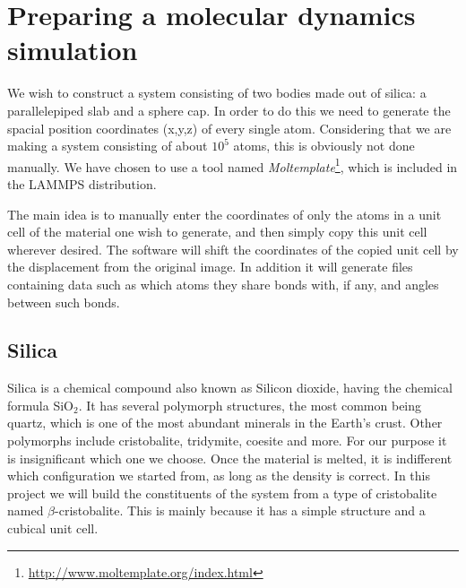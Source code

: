 \documentclass[twoside,english]{uiofysmaster}
\begin{document}
\chapter{Preparing a molecular dynamics simulation}

We wish to construct a system consisting of two bodies made out of silica: a parallelepiped slab and a sphere cap. In order to do this we need to generate the spacial position coordinates (x,y,z) of every single atom. Considering that we are making a system consisting of about $10^5$ atoms, this is obviously not done manually. We have chosen to use a tool named \textit{Moltemplate}\footnote{\href{http://www.moltemplate.org/index.html}{http://www.moltemplate.org/index.html}}, which is included in the LAMMPS distribution.

The main idea is to manually enter the coordinates of only the atoms in a unit cell of the material one wish to generate, and then simply copy this unit cell wherever desired. The software will shift the coordinates of the copied unit cell by the displacement from the original image. In addition it will generate files containing data such as which atoms they share bonds with, if any, and angles between such bonds. 

\section{Silica}
Silica is a chemical compound also known as Silicon dioxide, having the chemical formula SiO$_2$. It has several polymorph structures, the most common being quartz, which is one of the most abundant minerals in the Earth's crust. Other polymorphs include cristobalite, tridymite, coesite and more.    
For our purpose it is insignificant which one we choose. 
Once the material is melted, it is indifferent which configuration we started from, as long as the density is correct.
In this project we will build the constituents of the system from a type of cristobalite named $\beta$-cristobalite. This is mainly because it has a simple structure and a cubical unit cell.
\end{document}

